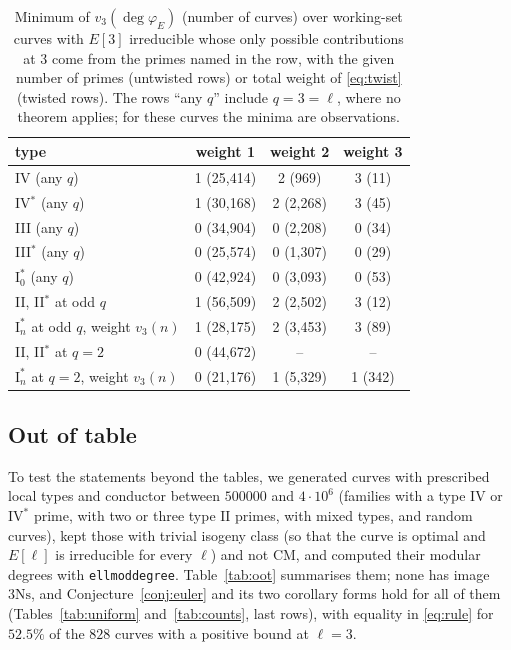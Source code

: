 \documentclass[11pt]{amsart}
\theoremstyle{definition}
\newcommand{\degphi}{\deg\varphi_E}
\newcommand{\Ns}{3\mathrm{Ns}}
\begin{document}
\begin{table}[ht]
\centering\small
{\small
\begin{tabular}{lccc}
\hline
type & weight 1 & weight 2 & weight 3 \\
\hline
IV (any $q$) & 1 (25,414) & 2 (969) & 3 (11) \\
IV$^*$ (any $q$) & 1 (30,168) & 2 (2,268) & 3 (45) \\
III (any $q$) & 0 (34,904) & 0 (2,208) & 0 (34) \\
III$^*$ (any $q$) & 0 (25,574) & 0 (1,307) & 0 (29) \\
$\mathrm{I}_0^*$ (any $q$) & 0 (42,924) & 0 (3,093) & 0 (53) \\
II, II$^*$ at odd $q$ & 1 (56,509) & 2 (2,502) & 3 (12) \\
$\mathrm{I}_n^*$ at odd $q$, weight $v_3(n)$ & 1 (28,175) & 2 (3,453) & 3 (89) \\
II, II$^*$ at $q=2$ & 0 (44,672) & -- & -- \\
$\mathrm{I}_n^*$ at $q=2$, weight $v_3(n)$ & 0 (21,176) & 1 (5,329) & 1 (342) \\
\hline
\end{tabular}
}
\caption{Minimum of $v_3(\degphi)$ (number of curves) over working-set curves with $E[3]$ irreducible whose only possible contributions at $3$ come from the primes named in the row, with the given number of primes (untwisted rows) or total weight of \eqref{eq:twist} (twisted rows). The rows ``any $q$'' include $q=3=\ell$, where no theorem applies; for these curves the minima are observations.}\label{tab:isolated}
\end{table}

\subsection{Out of table}\label{sec:oot}
To test the statements beyond the tables, we generated curves with prescribed local types and conductor between $500000$ and $4\cdot10^6$ (families with a type $\mathrm{IV}$ or $\mathrm{IV}^*$ prime, with two or three type $\mathrm{II}$ primes, with mixed types, and random curves), kept those with trivial isogeny class (so that the curve is optimal and $E[\ell]$ is irreducible for every $\ell$) and not CM, and computed their modular degrees with \texttt{ellmoddegree}. Table~\ref{tab:oot} summarises them; none has image $\Ns$, and Conjecture~\ref{conj:euler} and its two corollary forms hold for all of them (Tables~\ref{tab:uniform} and~\ref{tab:counts}, last rows), with equality in \eqref{eq:rule} for $52.5\%$ of the $828$ curves with a positive bound at $\ell=3$.
\end{document}
